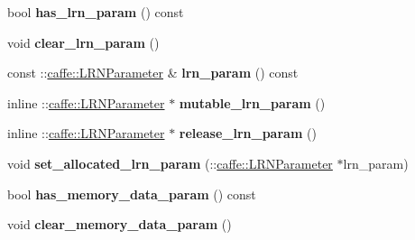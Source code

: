 \begin{DoxyCompactItemize}
\item 
\mbox{\label{classcaffe_1_1_layer_parameter_abbaba38d29bf09018524607cde13190c}} 
bool {\bfseries has\+\_\+lrn\+\_\+param} () const
\item 
\mbox{\label{classcaffe_1_1_layer_parameter_ac77444e83d627ddc21dab023de006052}} 
void {\bfseries clear\+\_\+lrn\+\_\+param} ()
\item 
\mbox{\label{classcaffe_1_1_layer_parameter_a677b4ec884f316dc1fee9d6aeea694af}} 
const \+::\mbox{\hyperlink{classcaffe_1_1_l_r_n_parameter}{caffe\+::\+L\+R\+N\+Parameter}} \& {\bfseries lrn\+\_\+param} () const
\item 
\mbox{\label{classcaffe_1_1_layer_parameter_a7783016c00d71570d3632055a58d714a}} 
inline \+::\mbox{\hyperlink{classcaffe_1_1_l_r_n_parameter}{caffe\+::\+L\+R\+N\+Parameter}} $\ast$ {\bfseries mutable\+\_\+lrn\+\_\+param} ()
\item 
\mbox{\label{classcaffe_1_1_layer_parameter_ad8028e9af1f72312a72243bf56bcc4f2}} 
inline \+::\mbox{\hyperlink{classcaffe_1_1_l_r_n_parameter}{caffe\+::\+L\+R\+N\+Parameter}} $\ast$ {\bfseries release\+\_\+lrn\+\_\+param} ()
\item 
\mbox{\label{classcaffe_1_1_layer_parameter_ac37985a2321c6e512b325ef32f8db657}} 
void {\bfseries set\+\_\+allocated\+\_\+lrn\+\_\+param} (\+::\mbox{\hyperlink{classcaffe_1_1_l_r_n_parameter}{caffe\+::\+L\+R\+N\+Parameter}} $\ast$lrn\+\_\+param)
\item 
\mbox{\label{classcaffe_1_1_layer_parameter_aaca42c251ae0bba3821057eb92ec7226}} 
bool {\bfseries has\+\_\+memory\+\_\+data\+\_\+param} () const
\item 
\mbox{\label{classcaffe_1_1_layer_parameter_aa4e5f5ebd110c89fb10270addf5d53ac}} 
void {\bfseries clear\+\_\+memory\+\_\+data\+\_\+param} ()
\item 
\mbox{\label{classcaffe_1_1_layer_parameter_a656a2b8d3d895ebc55396db4bfeed9f5}} 

\end{DoxyCompactItemize}
